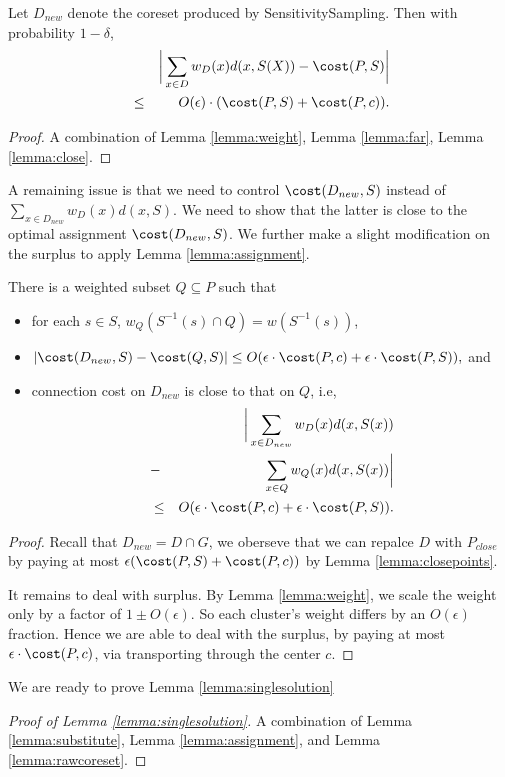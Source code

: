 \begin{lemma} \label{lemma:rawcoreset}
Let $D_{new}$ denote the coreset produced by \textsf{SensitivitySampling}. Then with probability $1-\delta$,
\begin{eqnarray*}
&&\bigg{|}
\sum_{x\in D} w_D(x)d(x,S(X))-\cost(P,S)
\bigg{|}\\
&\leq& O(\epsilon)\cdot (\cost(P,S)+\cost(P,c)).
\end{eqnarray*}
\end{lemma}

\begin{proof}
A combination of Lemma \ref{lemma:weight}, Lemma \ref{lemma:far}, Lemma \ref{lemma:close}.
\end{proof}


A remaining issue is that we need to control $\cost(D_{new},S)$ instead of $\sum_{x\in D_{new}} w_D(x)d(x,S)$. We need to show that the latter is close to the optimal assignment $\cost(D_{new},S)$.  We further make a slight modification on the surplus to apply Lemma \ref{lemma:assignment}.

\begin{lemma} \label{lemma:substitute}
There is a weighted subset $Q\subseteq P$ such that 

\begin{itemize}
    \item for each $s\in S$, $w_Q(S^{-1}(s)\cap Q)=w(S^{-1}(s))$, 
    \item $
|\cost(D_{new},S)-\cost(Q,S)|\leq O(\epsilon \cdot \cost(P,c)+\epsilon\cdot \cost(P,S)),
$
and 
\item connection cost on $D_{new}$ is close to that on $Q$, i.e,
\begin{eqnarray*}
&&\bigg{|}\sum_{x\in D_{new}} w_D(x) d(x,S(x))\\&-&\sum_{x\in Q} w_Q(x) d(x,S(x))
\bigg{|}\\&\leq& O(\epsilon \cdot \cost(P,c)+\epsilon\cdot \cost(P,S)).
\end{eqnarray*}
\end{itemize}
\end{lemma}

\begin{proof}
Recall that $D_{new}=D\cap G$, we oberseve that we can repalce $D$ with $P_{close}$ by paying at most $\epsilon (\cost(P,S)+\cost(P,c))$ by Lemma \ref{lemma:closepoints}.

It remains to deal with surplus. By Lemma \ref{lemma:weight}, we scale the weight only by a factor of $1\pm O(\epsilon)$. So each cluster's weight differs by an $O(\epsilon)$ fraction. Hence we are able to deal with the surplus, by paying at most $\epsilon\cdot  \cost(P,c)$, via transporting through the center $c$.
\end{proof}

We are ready to prove Lemma \ref{lemma:singlesolution}
\begin{proof}[Proof of Lemma \ref{lemma:singlesolution}]
A combination of Lemma \ref{lemma:substitute}, Lemma \ref{lemma:assignment}, and Lemma \ref{lemma:rawcoreset}.
\end{proof}

